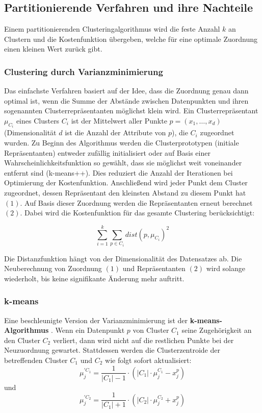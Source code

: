 \documentclass[11pt,ceqn]{book}
\begin{document}
\subsection{Partitionierende Verfahren und ihre Nachteile}
Einem partitionierenden Clusteringalgorithmus wird die feste Anzahl $k$ an Clustern und die Kostenfunktion übergeben, welche für eine optimale Zuordnung einen kleinen Wert zurück gibt.
\subsubsection{Clustering durch Varianzminimierung}
Das einfachste Verfahren basiert auf der Idee, dass die Zuordnung genau dann optimal ist, wenn die Summe der Abstände zwischen Datenpunkten und ihren sogenannten Clusterrepräsentanten möglichst klein wird. Ein Clusterrepräsentant $\mu_{C_i}$ eines Clusters $C_i$ ist der Mittelwert aller Punkte $p = (x_1,\dots,x_d)$ (Dimensionalität $d$ ist die Anzahl der Attribute von $p$), die $C_i$ zugeordnet wurden. Zu Beginn des Algorithmus werden die Clusterprototypen (initiale Repräsentanten) entweder zufällig initialisiert oder auf Basis einer Wahrscheinlichkeitsfunktion so gewählt, dass sie möglichst weit voneinander entfernt sind (k-means++\cite{kmplus}). Dies reduziert die Anzahl der Iterationen bei Optimierung der Kostenfunktion. Anschließend wird jeder Punkt dem Cluster zugeordnet, dessen Repräsentant den kleinsten Abstand zu diesem Punkt hat $(1)$. Auf Basis dieser Zuordnung werden die Repräsentanten erneut berechnet $(2)$. Dabei wird die Kostenfunktion für das gesamte Clustering berücksichtigt:

$$\sum_{i=1}^{k}\sum_{p \in C_i}^{} dist(p,\mu_{C_i})^2$$

Die Distanzfunktion hängt von der Dimensionalität des Datensatzes ab. Die Neuberechnung von Zuordnung $(1)$ und Repräsentanten $(2)$ wird solange wiederholt, bis keine signifikante Änderung mehr auftritt.

\subsubsection{k-means}

Eine beschleunigte Version der Varianzminimierung ist der \textbf{k-means-Algorithmus} \cite{forgy}. Wenn ein Datenpunkt $p$ von Cluster $C_1$ seine Zugehörigkeit an den Cluster $C_2$ verliert, dann wird nicht auf die restlichen Punkte bei der Neuzuordnung gewartet. Stattdessen werden die Clusterzentroide der betreffenden Cluster $C_1$ und $C_2$ wie folgt sofort aktualisiert:
$$\mu_j^{' C_1} = \frac{1}{|C_1|-1}\cdot(|C_1|\cdot \mu_j^{C_1} - x_j^p)$$ und $$\mu_j^{' C_2} = \frac{1}{|C_1|+1}\cdot(|C_2|\cdot \mu_j^{C_2} + x_j^p)$$ 
\end{document}
